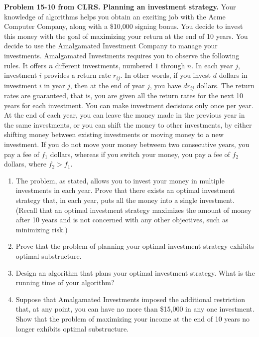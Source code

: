 \documentclass[11pt,letterpaper]{article}
\begin{document}
\noindent
\textbf{Problem 15-10 from CLRS. Planning an investment
strategy.} 
Your knowledge of algorithms helps you obtain an exciting
job with the Acme Computer Company, along with a \$10,000
signing bonus. You decide to invest this money with the goal
of maximizing your return at the end of 10 years. You decide
to use the Amalgamated Investment Company to manage your
investments. Amalgamated Investments requires you to observe
the following rules. It offers $n$ different investments,
numbered $1$ through $n$. In each year $j$, investment $i$
provides a return rate $r_{ij}$. In other words, if you
invest $d$ dollars in investment $i$ in year $j$, then at
the end of year $j$, you have $dr_{ij}$ dollars. The return
rates are guaranteed, that is, you are given all the return
rates for the next 10 years for each investment. You can
make investment decisions only once per year. At the end of
each year, you can leave the money made in the previous year
in the same investments, or you can shift the money to other
investments, by either shifting money between existing
investments or moving money to a new investment. If you do
not move your money betweem two consecutive years, you pay a
fee of $f_1$ dollars, whereas if you switch your money, you
pay a fee of $f_2$ dollars, where $f_2>f_1$.
\begin{enumerate}[label=\alph*),labelindent=0pt, itemsep=0pt]
\item The problem, as stated, allows you to invest your
money in multiple investments in each year. Prove that there
exists an optimal investment strategy that, in each year,
puts all the money into a single investment. (Recall that an
optimal investment strategy maximizes the amount of money
after 10 years and is not concerned with any other
objectives, such as minimizing risk.)
\item Prove that the problem of planning your optimal
investment strategy exhibits optimal substructure.
\item Design an algorithm that plans your optimal investment
strategy. What is the running time of your algorithm?
\item Suppose that Amalgamated Investments imposed the
additional restriction that, at any point, you can have no
more than \$15,000 in any one investment. Show that the
problem of maximizing your income at the end of 10 years no
longer exhibits optimal substructure.
\end{enumerate}
\end{document}
